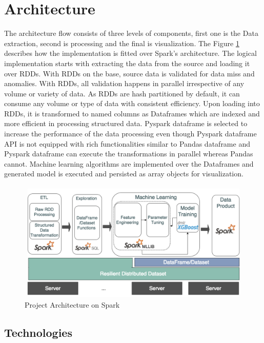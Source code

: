 \documentclass[sigconf]{acmart}
\begin{document}
\section{Architecture}
The architecture flow consists of three levels of components, first one is the Data extraction, second is processing and the final is visualization. The Figure \ref{Architecture:project} describes how the implementation is fitted over Spark's architecture.
The logical implementation starts with extracting the data from the source and loading it over RDDs. With RDDs on the base, source data is validated for data miss and anomalies. With RDDs, all validation happens in parallel irrespective of any volume or variety of data. As RDDs are hash partitioned by default, it can consume any volume or type of data with consistent efficiency. Upon loading into RDDs, it is transformed to named columns as Dataframes which are indexed and more efficient in processing structured data. Pyspark dataframe is selected to increase the performance of the data processing even though Pyspark dataframe API is not equipped with rich functionalities similar to Pandas dataframe and Pyspark dataframe can execute the transformations in parallel whereas Pandas cannot. Machine learning algorithms are implemented over the Dataframes and generated model is executed and persisted as array objects for visualization.

\begin{figure}[!ht]
  \centering\includegraphics[width=\columnwidth]{images/Projectflow.png}
  \caption{Project Architecture on Spark \cite{project:fig}}
  \label{Architecture:project}
\end{figure}


\subsection{Technologies}
\end{document}
